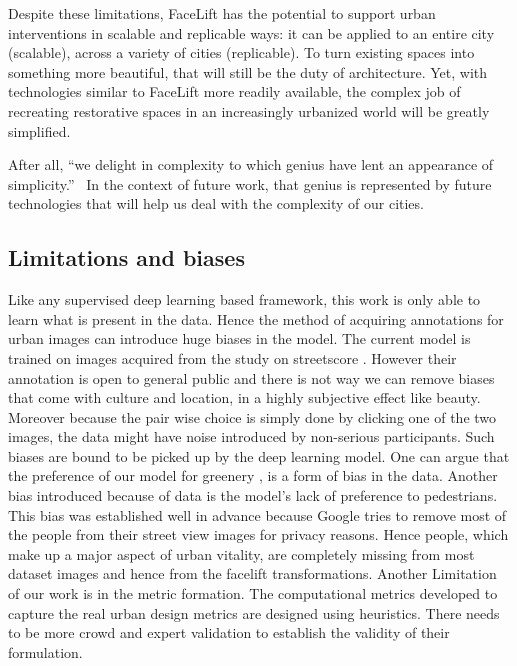 Despite these limitations, FaceLift has the potential to support urban interventions  in scalable  and replicable ways: it can be applied to an entire city (scalable), across a variety of cities (replicable). To turn existing spaces into something more beautiful, that will still be the duty of architecture. Yet, with technologies similar to FaceLift more readily available, the complex job of recreating restorative spaces in an increasingly urbanized world will be greatly simplified.  


After all, ``we delight in complexity to which genius have lent an appearance of simplicity.''~\cite{de2008architecture} In the context of future work, that genius is represented by future technologies that will help us deal with the complexity of our cities.



\subsection{Limitations and biases}
Like any supervised deep learning based framework, this work is only able to learn what is present in the data. Hence the method of acquiring annotations  for urban images can introduce huge biases in the model. The current model is trained on images acquired from the study on streetscore \cite{naik2014streetscore}. However their annotation is open to general public and there is not way we can remove biases that come with culture and location, in a highly subjective effect like beauty. Moreover because the pair wise choice is simply done by clicking one of the two images, the data might have noise introduced by non-serious participants. Such biases are bound to be picked up by the deep learning model. One can argue that the preference of our model for greenery , is a form of bias in the data. Another bias introduced because of data is the model's lack of preference to pedestrians. This bias was established well in advance because Google tries to remove most of the people from their street view images for privacy reasons. Hence people, which make up a major aspect of urban vitality, are completely missing from most dataset images and hence from the facelift transformations. 
Another Limitation of our work is in the metric formation. The computational metrics developed to capture the real urban design metrics are designed using heuristics. There needs to be more crowd and expert validation to establish the validity of their formulation. 
%
